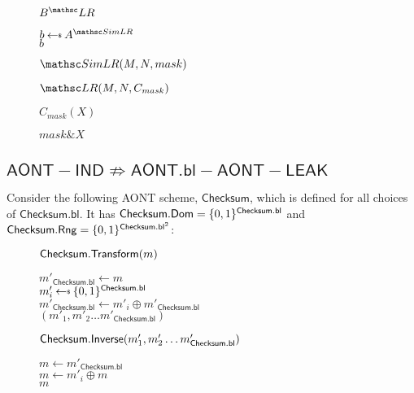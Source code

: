 \documentclass[11pt,twoside]{article}
\begin{document}
\begin{figure}[H]
{
\underline{$\advB^\LRO$}

\begin{algorithm}[H]
$b\getsr \advA^{\procfont{SimLR}}$\\
\Return $b$
\end{algorithm}

\underline{$\procfont{SimLR}(M,N,mask)$}

\begin{algorithm}[H]
\Return $\LRO(M,N,C_{mask})$
\end{algorithm}

\underline{$C_{mask}(X)$}

\begin{algorithm}[H]
\Return $mask \mathrel{\&} X$
\end{algorithm}
}
\end{figure}


\subsection{$\mathsf{AONT-IND} \not\Rightarrow \mathsf{AONT.bl-AONT-LEAK}$}

Consider the following AONT scheme, $\mathsf{Checksum}$, which is defined for all choices of $\mathsf{Checksum.bl}$. It has $\mathsf{Checksum.Dom}=\{0,1\}^{\mathsf{Checksum.bl}}$ and $\mathsf{Checksum.Rng}=\{0,1\}^{\mathsf{Checksum.bl}^2}$:

\begin{figure}[H]
{
\underline{$\mathsf{Checksum.Transform}(m)$}
\begin{algorithm}[H]
$m'_\mathsf{Checksum.bl}\gets m$\\
{
$m'_i\getsr \bits^\mathsf{Checksum.bl}$\\
$m'_\mathsf{Checksum.bl}\gets m'_i \oplus m'_\mathsf{Checksum.bl}$\\
}
\Return $(m'_1,m'_2\dots m'_\mathsf{Checksum.bl})$
\end{algorithm}
}
{
\underline{$\mathsf{Checksum.Inverse}(m'_1,m'_2\dots m'_\mathsf{Checksum.bl})$}

\begin{algorithm}[H]
$m\gets m'_\mathsf{Checksum.bl}$\\
{
$m\gets m'_i \oplus m$\\
}
\Return $m$ 
\end{algorithm}
}
\end{figure} 
\end{document}
